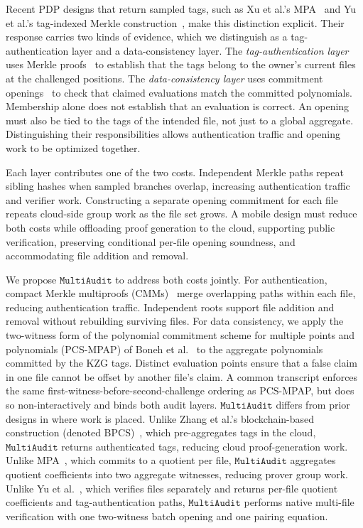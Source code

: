 \documentclass[lettersize,journal]{IEEEtran}
\newcommand{\MultiAudit}{\ensuremath{\mathtt{MultiAudit}}}
\begin{document}
Recent PDP designs that return sampled tags, such as Xu et al.'s MPA~\cite{XuTIFS26} and Yu et al.'s tag-indexed Merkle construction~\cite{YuTC25}, make this distinction explicit. Their response carries two kinds of evidence, which we distinguish as a tag-authentication layer and a data-consistency layer. The \emph{tag-authentication layer} uses Merkle proofs~\cite{Merkle1988,XuTIFS26,YuTC25} to establish that the tags belong to the owner's current files at the challenged positions. The \emph{data-consistency layer} uses commitment openings~\cite{Kate2010KZG} to check that claimed evaluations match the committed polynomials. Membership alone does not establish that an evaluation is correct. An opening must also be tied to the tags of the intended file, not just to a global aggregate. Distinguishing their responsibilities allows authentication traffic and opening work to be optimized together.

Each layer contributes one of the two costs. Independent Merkle paths repeat sibling hashes when sampled branches overlap, increasing authentication traffic and verifier work. Constructing a separate opening commitment for each file repeats cloud-side group work as the file set grows. A mobile design must reduce both costs while offloading proof generation to the cloud, supporting public verification, preserving conditional per-file opening soundness, and accommodating file addition and removal.

We propose $\mathtt{\MultiAudit{}}$ to address both costs jointly. For authentication, compact Merkle multiproofs (CMMs)~\cite{Ramabaja2020Compact} merge overlapping paths within each file, reducing authentication traffic. Independent roots support file addition and removal without rebuilding surviving files. For data consistency, we apply the two-witness form of the polynomial commitment scheme for multiple points and polynomials (PCS-MPAP) of Boneh et al.~\cite{Boneh2020PCS} to the aggregate polynomials committed by the KZG tags. Distinct evaluation points ensure that a false claim in one file cannot be offset by another file's claim.
A common transcript enforces the same first-witness-before-second-challenge ordering as PCS-MPAP, but does so non-interactively and binds both audit layers.
\MultiAudit{} differs from prior designs in where work is placed. Unlike Zhang et al.'s blockchain-based construction (denoted BPCS)~\cite{ZhangTPDS23}, which pre-aggregates tags in the cloud, \MultiAudit{} returns authenticated tags, reducing cloud proof-generation work. Unlike MPA~\cite{XuTIFS26}, which commits to a quotient per file, \MultiAudit{} aggregates quotient coefficients into two aggregate witnesses, reducing prover group work. Unlike Yu et al.~\cite{YuTC25}, which verifies files separately and returns per-file quotient coefficients and tag-authentication paths, \MultiAudit{} performs native multi-file verification with one two-witness batch opening and one pairing equation.
\end{document}
